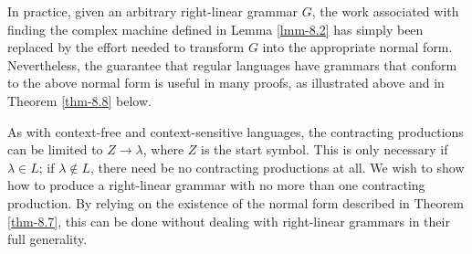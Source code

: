 In practice, given an arbitrary right-linear grammar $G$, the work associated
with finding the complex machine defined in Lemma \ref{lmm-8.2} has simply been replaced
by the effort needed to transform $G$ into the appropriate normal form.
Nevertheless, the guarantee that regular languages have grammars that conform to
the above normal form is useful in many proofs, as illustrated above and in
Theorem \ref{thm-8.8} below.

As with context-free and context-sensitive languages, the contracting
productions can be limited to $Z\rightarrow\lambda$, where $Z$ is the start
symbol. This is only necessary if $\lambda\in L$; if $\lambda \not \in L$, there
need be no contracting productions at all. We wish to show how to produce a
right-linear grammar with no more than one contracting production. By relying on the
existence of the normal form described in Theorem \ref{thm-8.7}, this can be done without
dealing with right-linear grammars in their full generality.

